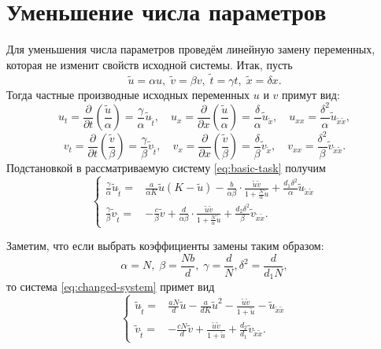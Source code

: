 \documentclass[a4paper, 11pt]{article}
\begin{document}
	\section{Уменьшение числа параметров}
	Для уменьшения числа параметров проведём линейную замену переменных, которая не изменит свойств исходной системы. Итак, пусть
	$$
		\tilde u = \alpha u, \;
		\tilde v = \beta v,  \;
		\tilde t = \gamma t, \;
		\tilde x = \delta x.
	$$
	Тогда частные производные исходных переменных $u$ и $v$ примут вид:
	$$
		u_t = \frac{\partial}{\partial t} \left(\frac{\tilde u}{\alpha}\right) =
		\frac{\gamma}{\alpha}\tilde u_{\tilde t},
		\quad
		u_x = \frac{\partial}{\partial x} \left(\frac{\tilde u}{\alpha}\right) =
		\frac{\delta}{\alpha}\tilde u_{\tilde x},
		\quad
		u_{xx} = \frac{\delta^2}{\alpha}\tilde u_{\tilde x \tilde x},
	$$
	$$
		v_t = \frac{\partial}{\partial t} \left(\frac{\tilde v}{\beta}\right) =
		\frac{\gamma}{\beta}\tilde v_{\tilde t},
		\quad
		v_x = \frac{\partial}{\partial x} \left(\frac{\tilde v}{\beta}\right) =
		\frac{\delta}{\beta}\tilde v_{\tilde x},
		\quad
		v_{xx} = \frac{\delta^2}{\beta}\tilde v_{\tilde x \tilde x}.
	$$
	Подстановкой в рассматриваемую систему \eqref{eq:basic-task} получим
	\begin{equation}\label{eq:changed-system}
		\left\{\begin{aligned}
			\frac{\gamma}{\alpha} \tilde u_{\tilde t} =&
			\frac{a}{\alpha K}\tilde u(K - \tilde u) -
			\frac{b}{\alpha\beta}\cdot\frac{\tilde u \tilde v}{1 + \frac{N}{\alpha}\tilde u} +
			\frac{d_1 \delta^2}{\alpha} \tilde u_{\tilde x \tilde x}\\
			\frac{\gamma}{\beta} \tilde v_{\tilde t} =&
			-\frac{c}{\beta} \tilde v +
			\frac{d}{\alpha\beta}\cdot\frac{\tilde u \tilde v}{1 + \frac{N}{\alpha}\tilde u} +
			\frac{d_2 \delta^2}{\beta} \tilde v_{\tilde x \tilde x}.
		\end{aligned}\right.
	\end{equation}

	Заметим, что если выбрать коэффициенты замены таким образом:
	$$
		\alpha = N,\; \beta = \frac{Nb}{d},\;
		\gamma = \frac{d}{N}, \delta^2 = \frac{d}{d_1 N},
	$$
	то система \eqref{eq:changed-system} примет вид
	\begin{equation}
		\left\{\begin{aligned}
		\tilde u_{\tilde t} =& \frac{aN}{d} \tilde u -
		\frac{a}{dK} \tilde u^2 -
		\frac{\tilde u \tilde v}{1 + \tilde u} -
		\tilde u_{\tilde x \tilde x}
		\\
		\tilde v_{\tilde t} =& - \frac{cN}{d}\tilde v +
		\frac{\tilde u \tilde v}{1 + \tilde u} +
		\frac{d_2}{d_1} \tilde v_{\tilde x \tilde x}.
		\end{aligned}\right.
	\end{equation}
\end{document}
